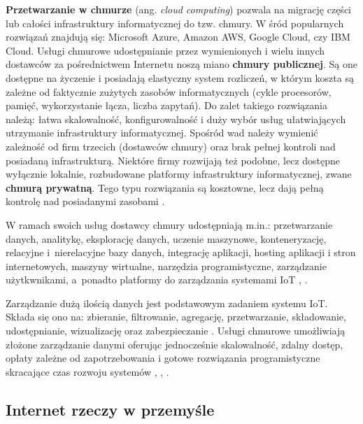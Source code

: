 \documentclass[a4paper, 12pt, twoside]{article}
\begin{document}
\textbf{Przetwarzanie w chmurze} (ang. \emph{cloud computing}) pozwala 
na migrację części lub całości infrastruktury informatycznej do tzw. chmury.
W śród popularnych rozwiązań znajdują się: 
Microsoft Azure, Amazon AWS, Google Cloud, czy IBM Cloud. Usługi chmurowe
udostępnianie przez wymienionych i wielu innych dostawców za pośrednictwem Internetu 
noszą miano \textbf{chmury publicznej}. 
Są one dostępne na życzenie i posiadają elastyczny
system rozliczeń, w którym koszta są zależne od faktycznie zużytych zasobów informatycznych
(cykle procesorów, pamięć, wykorzystanie łącza, liczba zapytań). Do zalet takiego
rozwiązania należą: łatwa skalowalność, konfigurowalność i duży wybór usług
ułatwiających utrzymanie infrastruktury informatycznej. Spośród wad należy wymienić
zależność od firm trzecich (dostawców chmury) oraz brak pełnej kontroli nad 
posiadaną infrastrukturą. Niektóre firmy rozwijają też podobne, lecz dostępne 
wyłącznie lokalnie, rozbudowane platformy infrastruktury informatycznej, zwane \textbf{chmurą prywatną}.
Tego typu rozwiązania są kosztowne, lecz dają pełną kontrolę nad posiadanymi zasobami \cite{iot-hype-to-reality}.

W ramach swoich usług dostawcy chmury udostępniają m.in.: przetwarzanie danych, 
analitykę, eksplorację danych, uczenie maszynowe, konteneryzację, relacyjne i~nierelacyjne
bazy danych, integrację aplikacji, hosting aplikacji i stron internetowych, 
maszyny wirtualne, narzędzia programistyczne, zarządzanie użytkwnikami, a~ponadto
platformy do zarządzania systemami IoT \cite{aws}, \cite{azure}.

Zarządzanie dużą ilością danych jest podstawowym zadaniem systemu IoT. Składa się ono
na: zbieranie, filtrowanie, agregację, przetwarzanie, składowanie, udostępnianie,
wizualizację oraz zabezpieczanie \cite{intro-to-iot}. Usługi chmurowe umożliwiają złożone zarządzanie
danymi oferując jednocześnie skalowalność, zdalny dostęp, opłaty zależne od zapotrzebowania
i gotowe rozwiązania programistyczne skracające czas rozwoju systemów
\cite{measuring-value-of-cloud-computing}, \cite{iot-and-cloud}, \cite{iot-in-industrial-sector}. 

\subsection{Internet rzeczy w przemyśle}\label{iiot}
\end{document}
